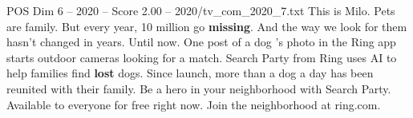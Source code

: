 \begin{textsample}{POS Dim 6 – 2020 – Score 2.00 – 2020/tv\_com\_2020\_7.txt}  \label{ex:f6_pos_041}
This is Milo.
Pets are family.
But every year, 10 million go \textbf{missing}.
And the way we look for them hasn't changed in years.
Until now.
One post of a dog 's photo in the Ring app starts outdoor cameras looking for a match.
Search Party from Ring uses AI to help families find \textbf{lost} dogs.
Since launch, more than a dog a day has been reunited with their family.
Be a hero in your neighborhood with Search Party.
Available to everyone for free right now.
Join the neighborhood at ring.com.

\end{textsample}

